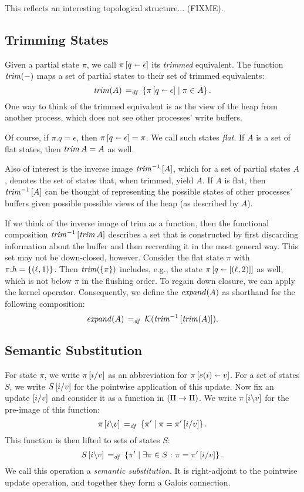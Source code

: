 \documentclass[11pt]{report}
\begin{document}
\begin{note}
	This reflects an interesting topological structure... (FIXME).
\end{note}
	
	
\subsection{Trimming States}

Given a partial state $\pi$, we call $\pi \left[ q \shortleftarrow \epsilon \right]$ its \emph{trimmed} equivalent. The function $\operatorname{\mathit{trim}}(-)$ maps a set of partial states to their set of trimmed equivalents: \[ \operatorname{\mathit{trim}}(A) \operatorname{\;=_{\mathit{df}}\;} \left\lbrace \pi \left[ q \shortleftarrow \epsilon \right] \mid \pi \in A \right\rbrace. \] One way to think of the trimmed equivalent is as the view of the heap from another process, which does not see other processes' write buffers. 

Of course, if $\pi.q = \epsilon$, then $\pi \left[ q \shortleftarrow \epsilon \right] = \pi$. We call such states \emph{flat}. If $A$ is a set of flat states, then $\operatorname{\mathit{trim}}{A} = A$ as well. 

Also of interest is the inverse image $\operatorname{\mathit{trim}}^{-1}\left[A\right]$, which for a set of partial states $A$, denotes the set of states that, when trimmed, yield $A$. If $A$ is flat, then $\operatorname{\mathit{trim}}^{-1}\left[A\right]$ can be thought of representing the possible states of other processes' buffers given possible possible views of the heap (as described by $A$). 

If we think of the inverse image of trim as a function, then the functional composition $\operatorname{\mathit{trim}}^{-1}\left[\operatorname{\mathit{trim}}{A}\right]$ describes a set that is constructed by first discarding information about the buffer and then recreating it in the most general way. This set may not be down-closed, however. Consider the flat state $\pi$ with $\pi.h = \left\lbrace (\ell,1) \right\rbrace$. Then $\operatorname{\mathit{trim}}(\left\lbrace \pi \right\rbrace)$ includes, e.g., the state $\pi \left[ q \shortleftarrow \left[(\ell,2)\right] \right]$ as well, which is not below $\pi$ in the flushing order. To regain down closure, we can apply the kernel operator. Consequently, we define the $\mathit{expand}(A)$ as shorthand for the following composition: \[ \mathit{expand}(A) \operatorname{\;=_{\mathit{df}}\;} \mathcal{K}(\operatorname{\mathit{trim}}^{-1}\left[\operatorname{\mathit{trim}}(A)\right]).\]

\subsection{Semantic Substitution}

For state $\pi$, we write $\pi\left[i / v\right]$ as an abbreviation for $\pi \left[ s(i) \shortleftarrow v \right]$. For a set of states $S$, we write $S\left[i / v\right]$ for the pointwise application of this update. Now fix an update $\left[i / v\right]$ and consider it as a function in $(\Pi \rightarrow \Pi)$. We write $\pi\left[i \backslash v\right]$ for the pre-image of this function: \[ \pi\left[i \backslash v\right] \operatorname{\;=_{\mathit{df}}\;} \left\lbrace \pi' \mid \pi = \pi'\left[i / v\right] \right\rbrace.\] This function is then lifted to sets of states $S$: \[ S\left[i \backslash v\right] \operatorname{\;=_{\mathit{df}}\;} \left\lbrace \pi' \mid \exists \pi \in S \operatorname{\,:\,} \pi = \pi'\left[i / v\right] \right\rbrace.\] We call this operation a \emph{semantic substitution}. It is right-adjoint to the pointwise update operation, and together they form a Galois connection. 
\end{document}
